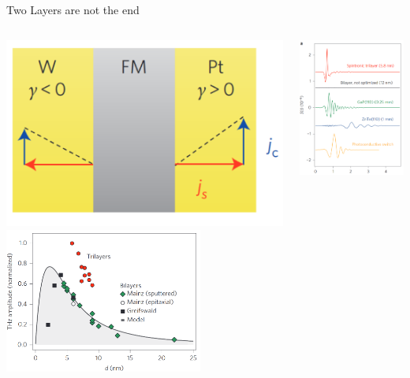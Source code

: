 \documentclass[aspectratio=1610, 9pt]{beamer}
\begin{document}
\begin{frame}{Two Layers are not the end}
  \begin{center}
  \begin{columns}
    \begin{column}{0.5\textwidth}
      \begin{center}
        \hspace{0.1in}
        \includegraphics[width=.6\textwidth]{pics/trilayer.png}
        \includegraphics[width=0.7\textwidth]{pics/aplitude.png}
        \nocite{seifert2016efficient}
      \end{center}
    \end{column}
    \begin{column}{.5\textwidth}
      \begin{center}
        \includegraphics[width=.6\textwidth]{pics/vergleich.png}
      \end{center}
    \end{column}
  \end{columns}
\end{center}
\end{frame}
\end{document}

